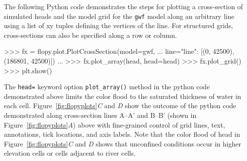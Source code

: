\documentclass[11pt, oneside]{article}  	%
\begin{document}
The following Python code demonstrates the steps for plotting a cross-section of simulated heads and the model grid for the \texttt{gwf} model along an arbitrary line using a list of xy tuples defining the vertices of the line. For structured grids, cross-sections can also be specified along a row or column.

\begin{python}
>>> fx = flopy.plot.PlotCrossSection(model=gwf, 
... line={"line": [(0, 42500), (186801, 42500)]})
...
>>> fx.plot_array(head, head=head)
>>> fx.plot_grid()
>>> plt.show()
\end{python}

\noindent The \texttt{head=} keyword option \texttt{plot\_array()} method in the python code demonstrated above limits the color flood to the saturated thickness of water in each cell. Figure~\ref{fig:flopyplots}\textit{C} and \textit{D} show the outcome of the python code demonstrated along cross-section lines A--A' and B--B' (shown in Figure~\ref{fig:flopyplots}\textit{A}) above with fine-grained control of grid lines, text, annotations, tick locations, and axis labels. Note that the color flood of head in Figure~\ref{fig:flopyplots}\textit{C} and \textit{D} shows that unconfined conditions occur in higher elevation cells or cells adjacent to river cells.
\end{document}
